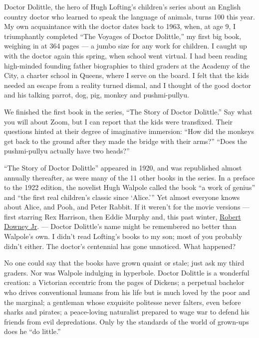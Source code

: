 Doctor Dolittle, the hero of Hugh Lofting's children's series about an
English country doctor who learned to speak the language of animals,
turns 100 this year. My own acquaintance with the doctor dates back to
1963, when, at age 9, I triumphantly completed ``The Voyages of Doctor
Dolittle,'' my first big book, weighing in at 364 pages --- a jumbo size
for any work for children. I caught up with the doctor again this
spring, when school went virtual. I had been reading high-minded
founding father biographies to third graders at the Academy of the City,
a charter school in Queens, where I serve on the board. I felt that the
kids needed an escape from a reality turned dismal, and I thought of the
good doctor and his talking parrot, dog, pig, monkey and pushmi-pullyu.

We finished the first book in the series, ``The Story of Doctor
Dolittle.'' Say what you will about Zoom, but I can report that the kids
were transfixed. Their questions hinted at their degree of imaginative
immersion: ``How did the monkeys get back to the ground after they made
the bridge with their arms?'' ``Does the pushmi-pullyu actually have two
heads?''

``The Story of Doctor Dolittle'' appeared in 1920, and was republished
almost annually thereafter, as were many of the 11 other books in the
series. In a preface to the 1922 edition, the novelist Hugh Walpole
called the book ``a work of genius'' and ``the first real children's
classic since `Alice.''' Yet almost everyone knows about Alice, and
Pooh, and Peter Rabbit. If it weren't for the movie versions --- first
starring Rex Harrison, then Eddie Murphy and, this past winter,
\href{https://www.nytimes3xbfgragh.onion/2020/01/15/movies/dolittle-review.html?searchResultPosition=2}{Robert
Downey Jr}. --- Doctor Dolittle's name might be remembered no better
than Walpole's own. I didn't read Lofting's books to my son; most of you
probably didn't either. The doctor's centennial has gone unnoticed. What
happened?

No one could say that the books have grown quaint or stale; just ask my
third graders. Nor was Walpole indulging in hyperbole. Doctor Dolittle
is a wonderful creation: a Victorian eccentric from the pages of
Dickens; a perpetual bachelor who drives conventional humans from his
life but is much loved by the poor and the marginal; a gentleman whose
exquisite politesse never falters, even before sharks and pirates; a
peace-loving naturalist prepared to wage war to defend his friends from
evil depredations. Only by the standards of the world of grown-ups does
he ``do little.''

